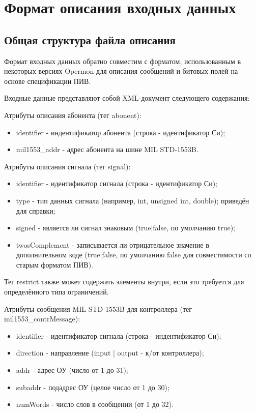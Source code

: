 \section{Формат описания входных данных}

\subsection{Общая структура файла описания}
Формат входных данных обратно совместим с форматом, использованным в некоторых 
версиях Opermon для описания сообщений и битовых полей на основе спецификации 
ПИВ.

Входные данные представляют собой XML-документ следующего содержания: 



Атрибуты описания абонента (тег abonent):

\begin{itemize}
 \item identifier - индентификатор абонента (строка - идентификатор Си);
 \item mil1553\_addr - адрес абонента на шине MIL STD-1553B.
\end{itemize}

Атрибуты описания сигнала (тег signal):

\begin{itemize}
 \item identifier - идентификатор сигнала (строка - идентификатор Си);
 \item type - тип данных сигнала (например, int, unsigned int, double); 
приведён для справки;
 \item signed - является ли сигнал знаковым (true|false, по умолчанию true);
 \item twosComplement - записывается ли отрицательное значение в 
дополнительном коде (true|false, по умолчанию false для совместимости со 
старым форматом ПИВ).
\end{itemize}

Тег restrict также может содержать элементы внутри, если это требуется для 
определённого типа ограничений.

Атрибуты сообщения MIL STD-1553B для контроллера (тег mil1553\_contrMessage):

\begin{itemize}
 \item identifier - идентификатор сигнала (строка - индентификатор Си);
 \item direction - направление (input | output - к/от контроллера);
 \item addr  - адрес ОУ (число от 1 до 31);
 \item subaddr - подадрес ОУ (целое число от 1 до 30);
 \item numWords - число слов в сообщении (от 1 до 32).
\end{itemize}

